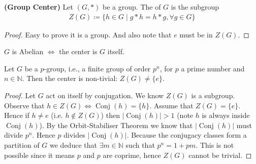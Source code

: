 \documentclass{article}
\newcommand{\bfs}[1]{\textbf{({#1}) }}
\begin{document}
\begin{defa}{\bfs{Group Center}}
Let $(G, *)$ be a group. The  of $G$ is the subgroup
\begin{align*}
Z(G)\coloneqq\{h \in G \mid g * h=h * g, \forall g \in G\}
\end{align*}
\end{defa} 
\begin{proof}
Easy to prove it is a group. And also note that $e$ must be in $Z(G)$.
\end{proof}
\begin{lema}\label{rem:oidnfa}
$G$ is Abelian $\Leftrightarrow$ the center is $G$ itself.
\end{lema}
\begin{thma}\label{thm:odnfad}
Let $G$ be a $p$-group, i.e., a finite group of order $p^{n}$, for $p$ a prime number and $n \in \mathbb{N}$. Then the center is non-tivial: $Z(G)\ne\{e\}$.
\end{thma} 
\begin{proof}
Let $G$ act on itself by conjugation. We know $Z(G)$ is a subgroup. Observe that $h \in Z(G) \Longleftrightarrow \operatorname{Conj}(h)=\{h\} .$ %
Assume that $Z(G)=\{e\} .$ Hence if $h \neq e$ (i.e. $h\notin Z(G)$) then $|\operatorname{Conj}(h)|>1$ (note $h$ is always inside $\operatorname{Conj}(h)$). By the Orbit-Stabiliser Theorem we know that $|\operatorname{Conj}(h)|$ must divide $p^{n}$. Hence $p$ divides $|\operatorname{Conj}(h)| .$ Because the conjugacy classes form a partition of $G$ we deduce that $\exists m \in \mathbb{N}$ such that $p^{n}=1+p m$. This is not possible since it means $p$ and $p$ are coprime, hence $Z(G)$ cannot be trivial.
\end{proof} 
\end{document}
